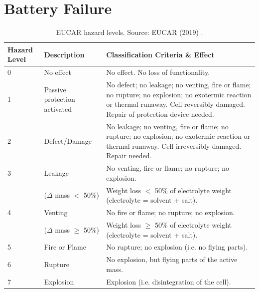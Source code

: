 \section{Battery Failure}
\label{sec:failure}
\begin{table}[H]
    \centering
        \begin{footnotesize}
            \begin{tabular}{|p{25mm} p{28mm} p{90mm}|}
                \hline
                \rowcolor{bluepoli!40}
                \textbf{Hazard Level} & \textbf{Description} & \textbf{Classification Criteria \& Effect}\T\B \\
                \hline \hline
                0 & No effect & No effect. No loss of functionality.\T\B\\
                \hline
                1 & Passive protection activated & No defect; no leakage; no venting, fire or flame; no rupture; no explosion; no exotermic reaction or thermal runaway. Cell reversibly damaged. Repair of protection device needed.\T\B\\
                \hline
                2 & Defect/Damage & No leakage; no venting, fire or flame; no rupture; no explosion; no exotermic reaction or thermal runaway. Cell irreversibly damaged. Repair needed.\T\B\\
                \hline
                3 & Leakage & No venting, fire or flame; no rupture; no explosion.\\
                & ($\Delta$ mass $<$ 50\%) & Weight loss $<$ 50\% of electrolyte weight (electrolyte = solvent + salt).\T\B\\
                \hline
                4 & Venting & No fire or flame; no rupture; no explosion.\\
                & ($\Delta$ mass $\geq$ 50\%) & Weight loss $\geq$ 50\% of electrolyte weight (electrolyte = solvent + salt).\T\B\\
                \hline
                5 & Fire or Flame & No rupture; no explosion (i.e. no flying parts).\T\B\\
                \hline
                6 & Rupture & No explosion, but flying parts of the active mass.\T\B\\
                \hline
                7 & Explosion & Explosion (i.e. disintegration of the cell).\T\B\\
                \hline
                \end{tabular}
                \\[10pt]
                \caption[EUCAR hazard levels]{EUCAR hazard levels. Source: EUCAR (2019) \cite{eucar2019}.}
                \label{table:eucar}
        \end{footnotesize}
\end{table}